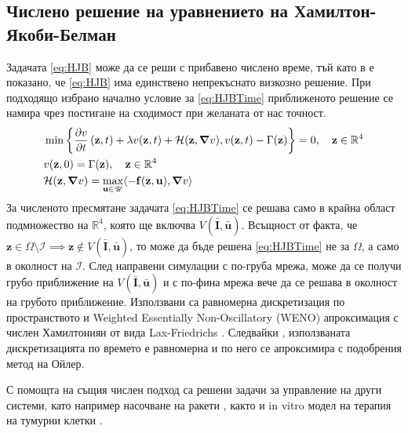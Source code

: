 \subsection{Числено решение на уравнението на Хамилтон-Якоби-Белман}
Задачата \eqref{eq:HJB} може да се реши с прибавено числено време, тъй като в \cite{Zidani2013} е показано, че \eqref{eq:HJB} има единствено непрекъснато визкозно решение.
При подходящо избрано начално условие за \eqref{eq:HJBTime} приближеното решение се намира чрез постигане на сходимост при желаната от нас точност.
\begin{equation}
  \label{eq:HJBTime}
  \begin{split}
    &\min\left\{\pdv{v}{t}\left(\mathbf{z}, t\right) + \lambda v(\mathbf{z}, t) + \mathcal{H}(\mathbf{z}, \grad{v}), v(\mathbf{z}, t) - \Gamma(\mathbf{z})\right\} = 0, \quad \mathbf{z} \in \mathbb{R}^4 \\
    &v(\mathbf{z}, 0) = \Gamma(\mathbf{z}), \quad \mathbf{z} \in \mathbb{R}^4 \\
    &\mathcal{H}(\mathbf{z}, \grad{v}) = \max_{\mathbf{u} \in \mathscr{U}} \langle -\mathbf{f}(\mathbf{z}, \mathbf{u}), \grad{v} \rangle
  \end{split}
\end{equation}
За численото пресмятане задачата \eqref{eq:HJBTime} се решава само в крайна област подмножество на $\mathbb{R}^4$, която ще включва $V(\bar{\mathbf{I}}, \bar{\mathbf{u}})$.
Всъщност от факта, че $\mathbf{z} \in \Omega \setminus \mathscr{I} \implies \mathbf{z} \notin V(\bar{\mathbf{I}}, \bar{\mathbf{u}})$, то може да бъде решена \eqref{eq:HJBTime} не за $\Omega$, а само в околност на $\mathscr{I}$.
След направени симулации с по-груба мрежа, може да се получи грубо приближение на $V(\bar{\mathbf{I}}, \bar{\mathbf{u}})$ и с по-фина мрежа вече да се решава в околност на грубото приближение.
Използвани са равномерна дискретизация по пространството и Weighted Essentially Non-Oscillatory (WENO) \cite[глава~3.4]{Osher2003} апроксимация с числен Хамилтониян от вида Lax-Friedrichs \cite[глава~5.3]{Osher2003}.
Следвайки \cite[глава~3.5]{Osher2003}, използваната дискретизацията по времето е равномерна и по него се апроксимира с подобрения метод на Ойлер.

\begin{remark}
  С помощта на същия числен подход са решени задачи за управление на други системи, като например насочване на ракети \cite{Assellaou2016, Assellaou2018}, както и in vitro модел на терапия на тумурни клетки \cite{Carrere2020}.
\end{remark}
